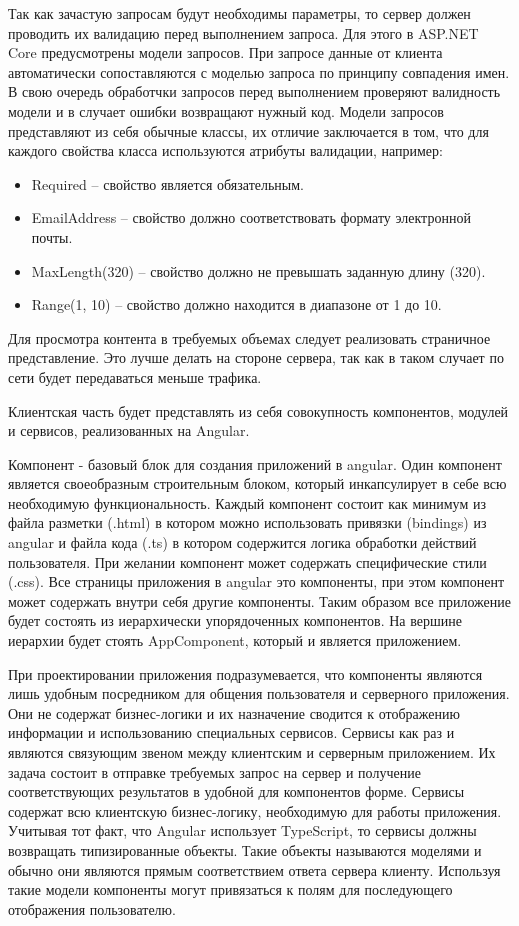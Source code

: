Так как зачастую запросам будут необходимы параметры, то сервер должен проводить их валидацию перед выполнением запроса. Для этого в ASP.NET Core предусмотрены модели запросов.
При запросе данные от клиента автоматически сопоставляются с моделью запроса по принципу совпадения имен. В свою очередь обработчки запросов перед выполнением проверяют валидность модели и в случает ошибки возвращают нужный код.
Модели запросов представляют из себя обычные классы, их отличие заключается в том, что для каждого свойства класса используются атрибуты валидации, например:
\begin{itemize}
	\item Required -- свойство является обязательным.
	\item EmailAddress -- свойство должно соответствовать формату электронной почты.
	\item MaxLength(320) -- свойство должно не превышать заданную длину (320). 
	\item Range(1, 10) -- свойство должно находится в диапазоне от 1 до 10.
\end{itemize} 

Для просмотра контента в требуемых объемах следует реализовать страничное представление. Это лучше делать на стороне сервера, так как в таком случает по сети будет передаваться меньше трафика.

Клиентская часть будет представлять из себя совокупность компонентов, модулей и сервисов, реализованных на Angular.

Компонент - базовый блок для создания приложений в angular. Один компонент является своеобразным строительным блоком, который инкапсулирует в себе всю необходимую функциональность.
Каждый компонент состоит как минимум из файла разметки (.html) в котором можно использовать привязки (bindings) из angular и файла кода (.ts) в котором содержится логика обработки действий пользователя.
При желании компонент может содержать специфические стили (.css).
Все страницы приложения в angular это компоненты, при этом компонент может содержать внутри себя другие компоненты. Таким образом все приложение будет состоять из иерархически упорядоченных компонентов.
На вершине иерархии будет стоять AppComponent, который и является приложением.

При проектировании приложения подразумевается, что компоненты являются лишь удобным посредником для общения пользователя и серверного приложения. Они не содержат бизнес-логики и их назначение сводится к 
отображению информации и использованию специальных сервисов. Сервисы как раз и являются связующим звеном между клиентским и серверным приложением. Их задача состоит в отправке требуемых запрос на сервер и
получение соответствующих результатов в удобной для компонентов форме. Сервисы содержат всю клиентскую бизнес-логику, необходимую для работы приложения. Учитывая тот факт, что Angular использует TypeScript,
то сервисы должны возвращать типизированные объекты. Такие объекты называются моделями и обычно они являются прямым соответствием ответа сервера клиенту. Используя такие модели компоненты могут 
привязаться к полям для последующего отображения пользователю.

